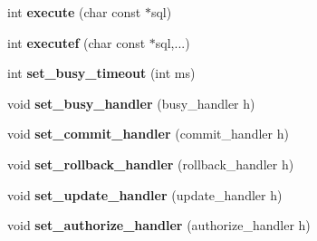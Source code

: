 \begin{DoxyCompactItemize}
\item 
\hypertarget{classsqlite3pp_1_1database_aef941b972df875ba2a5062d324c72a7a}{int {\bfseries execute} (char const $\ast$sql)}\label{classsqlite3pp_1_1database_aef941b972df875ba2a5062d324c72a7a}

\item 
\hypertarget{classsqlite3pp_1_1database_a19fbbc61f8fd5b398f904d343c1c27a9}{int {\bfseries executef} (char const $\ast$sql,...)}\label{classsqlite3pp_1_1database_a19fbbc61f8fd5b398f904d343c1c27a9}

\item 
\hypertarget{classsqlite3pp_1_1database_aeace5855fa4540a6716321c2af0499bd}{int {\bfseries set\-\_\-busy\-\_\-timeout} (int ms)}\label{classsqlite3pp_1_1database_aeace5855fa4540a6716321c2af0499bd}

\item 
\hypertarget{classsqlite3pp_1_1database_adf5482aa554f0e4612d3ba83cbde6d7c}{void {\bfseries set\-\_\-busy\-\_\-handler} (busy\-\_\-handler h)}\label{classsqlite3pp_1_1database_adf5482aa554f0e4612d3ba83cbde6d7c}

\item 
\hypertarget{classsqlite3pp_1_1database_aec8828634ab248e318d9605cbafaac2a}{void {\bfseries set\-\_\-commit\-\_\-handler} (commit\-\_\-handler h)}\label{classsqlite3pp_1_1database_aec8828634ab248e318d9605cbafaac2a}

\item 
\hypertarget{classsqlite3pp_1_1database_a02558b73420568fa8f0199da031b13e6}{void {\bfseries set\-\_\-rollback\-\_\-handler} (rollback\-\_\-handler h)}\label{classsqlite3pp_1_1database_a02558b73420568fa8f0199da031b13e6}

\item 
\hypertarget{classsqlite3pp_1_1database_aa0ce424227761d27a4633375f8e309f4}{void {\bfseries set\-\_\-update\-\_\-handler} (update\-\_\-handler h)}\label{classsqlite3pp_1_1database_aa0ce424227761d27a4633375f8e309f4}

\item 
\hypertarget{classsqlite3pp_1_1database_ab5b1c02d58c555c5889d29c3ae8535b4}{void {\bfseries set\-\_\-authorize\-\_\-handler} (authorize\-\_\-handler h)}\label{classsqlite3pp_1_1database_ab5b1c02d58c555c5889d29c3ae8535b4}

\end{DoxyCompactItemize}
